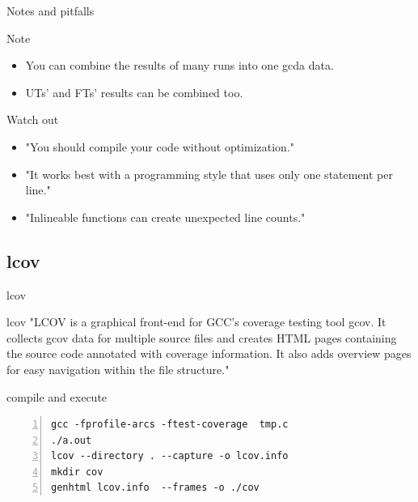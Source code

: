 \documentclass{beamer}
\begin{document}

\begin{frame}{Notes and pitfalls}

\begin{block}{Note}
\small

\begin{itemize}
  \item You can combine the results of many runs into one gcda data.
  \item UTs' and FTs' results can be combined too.
\end{itemize}
\end{block}


\begin{block}{Watch out}
\small

\begin{itemize}
  \item "You should compile your code without optimization."
  \item "It works best with a programming style that uses only one statement per line."
  \item "Inlineable functions can create unexpected line counts."
\end{itemize}
\end{block}

\end{frame}


\subsection{lcov}

\begin{frame}[fragile]{lcov}

\begin{block}{lcov}
\small
"LCOV is a graphical front-end for GCC's coverage testing tool gcov. It collects gcov data for multiple source files and creates HTML pages containing the source code annotated with coverage information. It also adds overview pages for easy navigation within the file structure." \cite{lcov}
\end{block}

\begin{exampleblock}{compile and execute}
\tiny
\begin{Verbatim}[numbers=left,firstnumber=1,stepnumber=1]
gcc -fprofile-arcs -ftest-coverage  tmp.c
./a.out
lcov --directory . --capture -o lcov.info
mkdir cov
genhtml lcov.info  --frames -o ./cov 
\end{Verbatim}
\end{exampleblock}

\end{frame}
\end{document}
